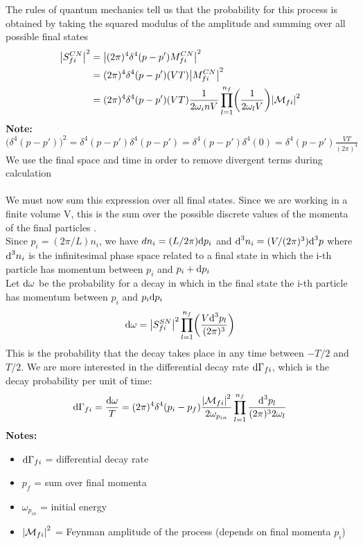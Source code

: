 \documentclass[TheoreticalPhy_ModB.tex]{subfiles}
\begin{document}
The rules of quantum mechanics tell us that the probability for this process is obtained by taking the squared modulus of the amplitude and summing over all possible final states
\[
\begin{split}
\abs{S_{fi}^{CN}}^2	& = \abs{(2 \pi)^4 \delta^4 (p - p')M_{fi}^{CN}}^2 \\
				& = (2 \pi)^4 \delta^4 (p - p') (VT) \abs{M_{fi}^{CN}}^2 \\
				& = (2 \pi)^4 \delta^4 (p - p')(VT) \frac{1}{2 \omega_in V}
					\prod_{l=1}^{n_f} \biggl( \frac{1}{2 \omega_l V} \biggr) \abs{\mathcal{M}_{fi}}^2
\end{split}
\]
\textbf{Note:} $\bigl( \delta^4 (p - p') \bigr)^2 = \delta^4 (p - p') \delta^4 (p - p') = \delta^4 (p - p') \delta^4(0) = \delta^4 (p - p') \frac{VT}{(2 \pi)^4}$\\
We use the final space and time in order to remove divergent terms during calculation\\ \\
We must now sum this expression over all final states. Since we are working in a finite volume V, this is the sum over the possible discrete values of the momenta of the final particles .\\
Since $p_i = (2 \pi/L) n_i$, we have $dn_i = (L/2\pi) \textup{d} p_i$ and $\textup{d}^3 n_i = (V/(2 \pi)^3) \textup{d}^3 p$ where $\textup{d}^3 n_i$ is the infinitesimal phase space related to a final state in which the i-th particle has momentum between $p_i$ and $p_i + \textup{d} p_i$\\
Let $\textup{d} \omega$ be the probability for a decay in which in the final state the i-th particle has momentum between $p_i$ and $p_i \textup{d} p_i$
\[
\textup{d} \omega = \abs{S_{fi}^{SN}}^2 \prod_{l=1}^{n_f} \biggl( \frac{V\textup{d}^3 p_l}{(2 \pi)^3} \biggr)
\]
This is the probability that the decay takes place in any time between $-T/2$ and $T/2$. We are more interested in the differential decay rate $\textup{d} \Gamma_{fi}$, which is the decay probability per unit of time:
\[
\textup{d} \Gamma_{fi} = \frac{\textup{d} \omega}{T} = (2 \pi)^4 \delta^4 (p_i - p_f) \frac{\abs{\mathcal{M}_{fi}}^2}{2 \omega_{p_{in}}}
	\prod_{l=1}^{n_f} \frac{\textup{d}^3 p_l}{(2 \pi)^3 2 \omega_l}
\]
\textbf{Notes:}
\begin{itemize}[label=$\bullet$]
\item $\textup{d} \Gamma_{fi}$ = differential decay rate
\item $p_f$ = sum over final momenta
\item $\omega_{p_{in}}$ = initial energy
\item $\abs{\mathcal{M}_{fi}}^2$ = Feynman amplitude of the process (depends on final momenta $p_i$)
\end{itemize}
\end{document}
